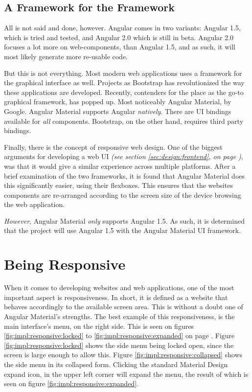		\subsection{A Framework for the Framework}
			All is not said and done, however. Angular comes in two variants: Angular 1.5, which is tried and tested, and Angular 2.0 which is still in beta. Angular 2.0 focuses a lot more on web-components, than Angular 1.5, and as such, it will most likely generate more re-usable code. 

			But this is not everything. Most modern web applications uses a framework for the graphical interface as well. Projects as Bootstrap has revolutionized the way these applications are developed. Recently, contenders for the place as the go-to graphical framework, has popped up. Most noticeably Angular Material, by Google. Angular Material supports Angular \emph{natively}. There are UI bindings available for \emph{all} components. Bootstrap, on the other hand, requires third party bindings. 

			Finally, there is the concept of responsive web design. One of the biggest arguments for developing a web UI \emph{(see section \ref{sec:design:frontend}, on page \pageref{sec:design:frontend})}, was that it would give a similar experience across multiple platforms. After a brief examination of the two frameworks, it is found that Angular Material does this significantly easier, using their flexboxes. This ensures that the websites components are re-arranged according to the screen size of the device browsing the web application.

			\emph{However}, Angular Material \emph{only} supports Angular 1.5. As such, it is determined that the project will use Angular 1.5 with the Angular Material UI framework.

	\section{Being Responsive}
		When it comes to developing websites and web applications, one of the most important aspect is responsiveness. In short, it is defined as a website that behaves accordingly to the available screen area. This is without a doubt one of Angular Material's strengths. The best example of this responsiveness, is the main interface's menu, on the right side. This is seen on figures \ref{fig:impl:responsive:locked} to \ref{fig:impl:responsive:expanded} on page \pageref{fig:impl:responsive:locked}. Figure \ref{fig:impl:responsive:locked} shows the side menu being locked open, since the screen is large enough to allow this. Figure \ref{fig:impl:responsive:collapsed} shows the side menu in its collapsed form. Clicking the standard Material Design expand icon, in the upper left corner will expand the menu, the result of which is seen on figure \ref{fig:impl:responsive:expanded}.

